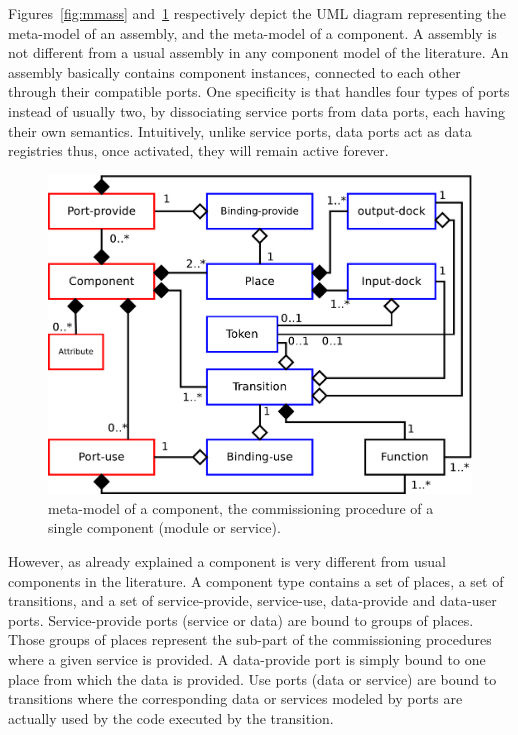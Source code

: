 Figures~\ref{fig:mmass} and~\ref{fig:mmcomp} respectively depict the
UML diagram representing the \mad meta-model of an assembly, and the
meta-model of a component. A \mad assembly is not different from a
usual assembly in any component model of the literature. An assembly
basically contains component instances, connected to each other
through their compatible ports. One specificity is that \mad handles
four types of ports instead of usually two, by dissociating service
ports from data ports, each having their own semantics. Intuitively,
unlike service ports, data ports act as data registries thus, once
activated, they will remain active forever.

\begin{figure}[tbp]
  \begin{center}
    \includegraphics[width=0.9\linewidth]{./images/component_uml.pdf}
  \end{center}
  \caption{\mad meta-model of a component, \ie the commissioning
    procedure of a single component (\ie module or service).}
  \label{fig:mmcomp}
\end{figure}

However, as already explained a \mad component is very different
from usual components in the literature. A component type contains a
set of places, a set of transitions, and a set of service-provide,
service-use, data-provide and data-user ports.
Service-provide ports (service or data) are bound to groups of
places. Those groups of places represent the sub-part of the
commissioning procedures where a given service is provided. A
data-provide port is simply bound to one place from which the data is
provided. Use ports (data or service) are bound to transitions where
the corresponding data or services modeled by ports are actually used
by the code executed by the transition.

